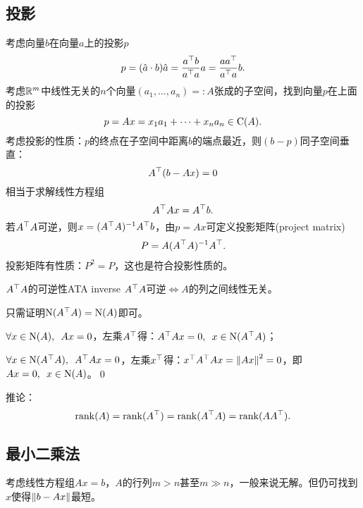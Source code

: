 \subsection{投影}
考虑向量$b$在向量$a$上的投影$p$
\[
	p=(\hat a\cdot b)\hat a=\frac{a^\top b}{a^\top a}a=\frac{aa^\top}{a^\top a}b.
\]
考虑$\mathbb R^m$中线性无关的$n$个向量$(a_1,\ldots,a_n)=:A$张成的子空间，找到向量$p$在上面的投影
\[
	p=Ax=x_1a_1+\cdots+x_na_n\in\operatorname{C}(A).
\]
考虑投影的性质：$p$的终点在子空间中距离$b$的端点最近，则$(b-p)$同子空间垂直：
\[
	A^\top(b-Ax)=0
\]
相当于求解线性方程组
\[
	A^\top Ax=A^\top b.
\]
若$A^\top A$可逆，则$x=(A^\top A)^{-1} A^\top b$，由$p=Ax$可定义投影矩阵(project matrix)
\begin{align}
	P=A(A^\top A)^{-1} A^\top.
\end{align}
投影矩阵有性质：$P^2=P$，这也是符合投影性质的。
\begin{theorem}{$A^\top A$的可逆性}{ATA inverse}
	$A^\top A$可逆$\iff A$的列之间线性无关。
\end{theorem}
\prf 只需证明$\operatorname{N}(A^\top A)=\operatorname{N}(A)$即可。

$\forall x\in\operatorname{N}(A),\enspace Ax=0$，左乘$A^\top$得：$A^\top Ax=0,\enspace x\in\operatorname{N}(A^\top A)$；

$\forall x\in\operatorname{N}(A^\top A),\enspace A^\top Ax=0$，左乘$x^\top$得：$x^\top A^\top Ax=\left\lVert Ax\right\rVert^2=0$，即$Ax=0,\enspace x\in\operatorname{N}(A)$。\qed

推论：
\[
	\operatorname{rank}(A)=\operatorname{rank}(A^\top)=\operatorname{rank}(A^\top A)=\operatorname{rank}(AA^\top).
\]
\subsection{最小二乘法}
考虑线性方程组$Ax=b$，$A$的行列$m>n$甚至$m\gg n$，一般来说无解。但仍可找到$x$使得$\left\lVert b-Ax\right\rVert$最短。

